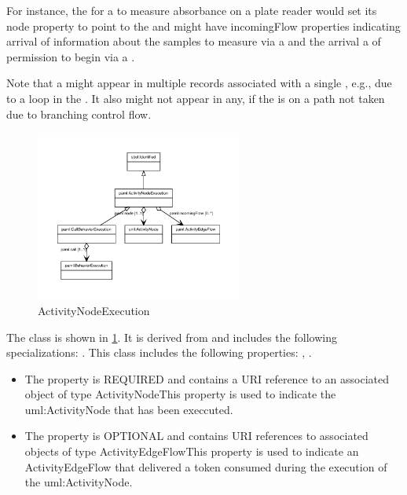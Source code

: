         For instance, the  for a  to measure absorbance on a plate reader
        would set its node property to point to the  and might have incomingFlow properties
        indicating arrival of information about the samples to measure via a  and the arrival a
        of permission to begin via a .

        Note that a  might appear in multiple  records associated with a single
        , e.g., due to a loop in the .  It also might not appear in any, if the
         is on a path not taken due to branching control flow.%
\newline%
\linebreak%


\begin{figure}[h!]%
\centering%
\includegraphics[width=0.6061702127659574\textwidth]{labop_classes/ActivityNodeExecution_abstraction_hierarchy.pdf}%
\caption{ActivityNodeExecution}%
\label{fig:ActivityNodeExecution}%
\end{figure}

%
The  class is shown in \ref{fig:ActivityNodeExecution}. It is derived from  and includes the following specializations: . %
This class includes the following properties: , . %
\begin{itemize}%
\item%
The  property is REQUIRED and contains a URI reference to an associated object of type ActivityNodeThis property is used to indicate the uml:ActivityNode that has been execcuted.%
\item%
The  property is OPTIONAL and contains URI references to associated objects of type ActivityEdgeFlowThis property is used to indicate an ActivityEdgeFlow that delivered a token consumed during
        the execution of the uml:ActivityNode.%
\end{itemize}%
